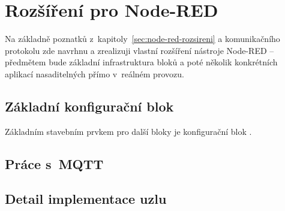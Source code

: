 \chapter{Rozšíření pro Node-RED}
\label{ch:rozsireni}

Na základně poznatků z~kapitoly~\ref{sec:node-red-rozsireni} a komunikačního protokolu zde navrhnu a zrealizuji vlastní
rozšíření nástroje Node-RED -- předmětem bude základní infrastruktura bloků a poté několik konkrétních aplikací
nasaditelných přímo v~reálném provozu.

\section{Základní konfigurační blok}
Základním stavebním prvkem pro další bloky je konfigurační blok .

\section{Práce s~MQTT}

\section{Detail implementace uzlu}

